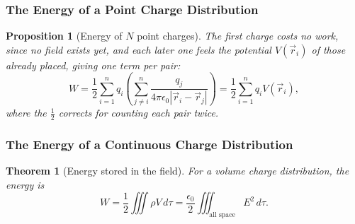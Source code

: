 \documentclass{article}
\newtheorem{theorem}{Theorem}
\newtheorem{proposition}{Proposition}
\begin{document}
\subsubsection{The Energy of a Point Charge Distribution}
\begin{proposition}[Energy of $N$ point charges]
    The first charge costs no work, since no field exists yet, and each later one feels the potential $V(\vec{r}_i)$ of those already placed, giving one term per pair:
    \begin{equation}
        W = \frac{1}{2}\sum_{i=1}^{n}q_i\left(\sum_{j\neq i}^n\frac{q_j}{4\pi\epsilon_0|\vec{r}_i - \vec{r}_j|}\right) = \frac{1}{2}\sum_{i=1}^{n}q_iV(\vec{r}_i),
    \end{equation}
    where the $\tfrac12$ corrects for counting each pair twice.
\end{proposition}

\subsubsection{The Energy of a Continuous Charge Distribution}
\begin{theorem}[Energy stored in the field]
    \label{E-stored-in-field}
    For a volume charge distribution, the energy is
    \begin{equation}
        W = \frac{1}{2}\iiint\rho V\,d\tau = \frac{\epsilon_0}{2}\iiint_{\text{all space}} E^2\,d\tau.
    \end{equation}
\end{theorem}
\end{document}
